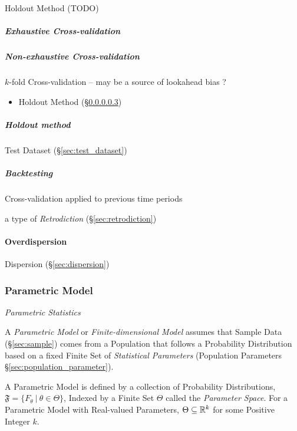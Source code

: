 Holdout Method (TODO)



\subparagraph{Exhaustive Cross-validation}
\label{sec:exhaustive_cross_validation}\hfill

\subparagraph{Non-exhaustive Cross-validation}
\label{sec:nonexhaustive_cross_validation}\hfill

$k$-fold Cross-validation -- may be a source of lookahead bias ?

\begin{itemize}
  \item Holdout Method (\S\ref{sec:holdout_method})
\end{itemize}



\subparagraph{Holdout method}\label{sec:holdout_method}\hfill

Test Dataset (\S\ref{sec:test_dataset})



\subparagraph{Backtesting}\label{sec:backtesting}\hfill

Cross-validation applied to previous time periods

a type of \emph{Retrodiction} (\S\ref{sec:retrodiction})



\paragraph{Overdispersion}\label{sec:overdispersion}\hfill


Dispersion (\S\ref{sec:dispersion})



\subsubsection{Parametric Model}\label{sec:parametric_model}

\emph{Parametric Statistics}

A \emph{Parametric Model} or \emph{Finite-dimensional Model} assumes that Sample
Data (\S\ref{sec:sample}) comes from a Population that follows a Probability
Distribution based on a fixed Finite Set of \emph{Statistical Parameters}
(Population Parameters \S\ref{sec:population_parameter}).

A Parametric Model is defined by a collection of Probability Distributions,
$\mathfrak{F} = \{ F_\theta \ |\ \theta \in \Theta \}$, Indexed by a Finite Set
$\Theta$ called the \emph{Parameter Space}. For a Parametric Model with
Real-valued Parameters, $\Theta \subseteq \mathbb{R}^k$ for some Positive Integer
$k$.

